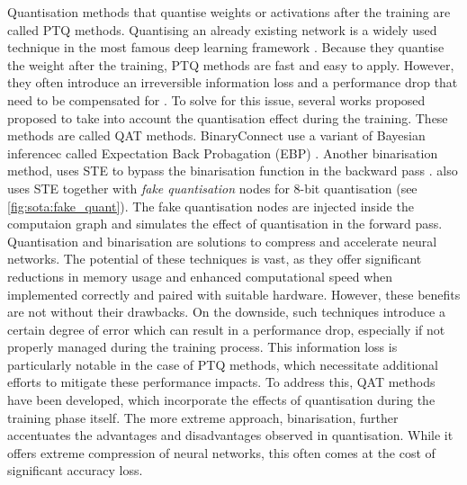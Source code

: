 Quantisation methods that quantise weights or activations after the training are
called \ac{PTQ} methods. Quantising an already existing network is a widely used
technique in the most famous deep learning framework
\cite{ncnn,qnnpack,snapdragon,tensorrt}. Because they quantise the weight after
the training, \ac{PTQ} methods are fast and easy to apply. However, they often
introduce an irreversible information loss and  a performance drop that need to
be compensated for \cite{DBLP:journals/ijon/LiangGWSZ21}. To solve for this
issue, several works proposed proposed to take into account the quantisation
effect during the training. These methods are called \ac{QAT} methods.
BinaryConnect \cite{courbariaux2015binaryconnect} use a variant of Bayesian
inferencec called Expectation Back Probagation (EBP)
\cite{DBLP:journals/corr/ChengSML15,DBLP:conf/nips/SoudryHM14}. Another
binarisation method, uses \acl{STE} \cite{DBLP:journals/corr/BengioLC13} to
bypass the binarisation function in the backward pass
\cite{DBLP:conf/nips/HubaraCSEB16}. \cite{DBLP:conf/cvpr/JacobKCZTHAK18} also
uses \ac{STE} together with \emph{fake quantisation} nodes for 8-bit
quantisation (see \cref{fig:sota:fake_quant}). The fake quantisation nodes are
injected inside the computaion graph and simulates the effect of quantisation in
the forward pass.\\

Quantisation and binarisation are solutions to compress and accelerate neural
networks. The potential of these techniques is vast, as they offer significant
reductions in memory usage and enhanced computational speed when implemented
correctly and paired with suitable hardware. However, these benefits are not
without their drawbacks. On the downside, such techniques introduce a certain
degree of error which can result in a performance drop, especially if not
properly managed during the training process. This information loss is
particularly notable in the case of \acl{PTQ} methods, which necessitate
additional efforts to mitigate these performance impacts. To address this,
\ac{QAT} methods have been developed, which incorporate the effects of
quantisation during the training phase itself. The more extreme approach,
binarisation, further accentuates the advantages and disadvantages observed in
quantisation. While it offers extreme compression of neural networks, this often
comes at the cost of significant accuracy loss.\\


